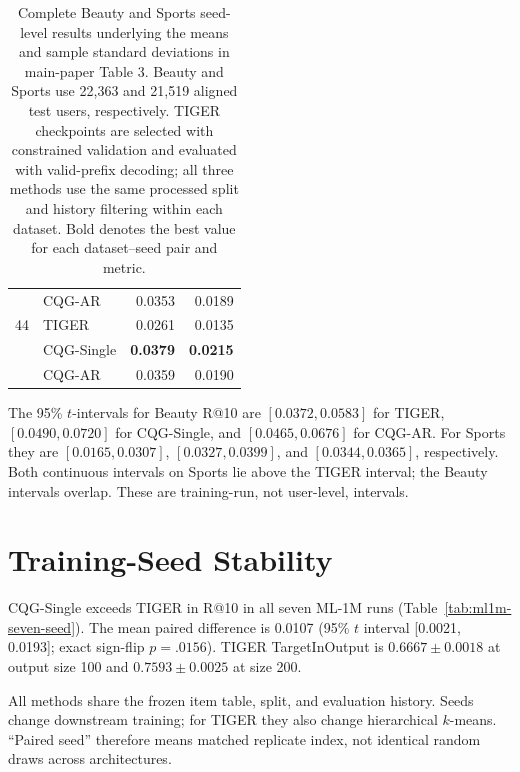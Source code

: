 \documentclass[letterpaper]{article}
\begin{document}
\begin{table}[H]
\begin{minipage}[t]{0.48\textwidth}
\begin{tabular}{llrr}
 & CQG-AR & 0.0353 & 0.0189 \\
44 & TIGER & 0.0261 & 0.0135 \\
 & CQG-Single & \textbf{0.0379} & \textbf{0.0215} \\
 & CQG-AR & 0.0359 & 0.0190 \\
\bottomrule
\end{tabular}
\end{minipage}
\caption{Complete Beauty and Sports seed-level results underlying the means
and sample standard deviations in main-paper Table 3. Beauty and Sports use
22,363 and 21,519 aligned test users, respectively. TIGER checkpoints are
selected with constrained validation and evaluated with valid-prefix
decoding; all three methods use the same processed split and history
filtering within each dataset. Bold denotes the best value for each
dataset--seed pair and metric.}
\label{tab:auto-tiger-results}
\end{table}

The 95\% \(t\)-intervals for Beauty R@10 are
\([0.0372,0.0583]\) for TIGER, \([0.0490,0.0720]\) for CQG-Single, and
\([0.0465,0.0676]\) for CQG-AR. For Sports they are
\([0.0165,0.0307]\), \([0.0327,0.0399]\), and
\([0.0344,0.0365]\), respectively. Both continuous intervals on Sports lie
above the TIGER interval; the Beauty intervals overlap. These are
training-run, not user-level, intervals.

\section{Training-Seed Stability}
\label{app:seed-stability}

CQG-Single exceeds TIGER in R@10 in all seven ML-1M runs
(Table~\ref{tab:ml1m-seven-seed}). The mean paired difference is 0.0107
(95\% $t$ interval [0.0021, 0.0193]; exact sign-flip $p=.0156$).
TIGER TargetInOutput is \(0.6667\pm0.0018\) at output size 100 and
\(0.7593\pm0.0025\) at size 200.

All methods share the frozen item table, split, and evaluation history.
Seeds change downstream training; for TIGER they also change hierarchical
$k$-means. ``Paired seed'' therefore means matched replicate index, not
identical random draws across architectures.
\end{document}
